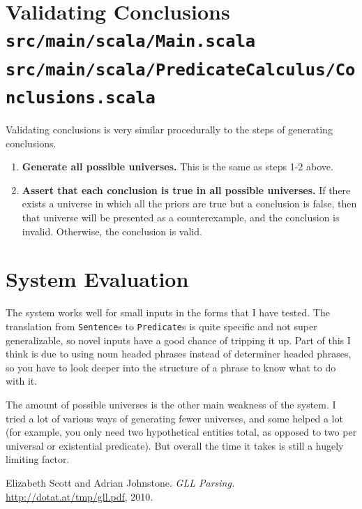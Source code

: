 \documentclass[a4paper, 11pt]{article}
\begin{document}
\section[Validating Conclusions]{Validating Conclusions
	\\ \normalsize \texttt{src/main/scala/Main.scala}
	\\ \normalsize \texttt{src/main/scala/PredicateCalculus/Conclusions.scala}}
Validating conclusions is very similar procedurally to the steps of generating conclusions.
\begin{enumerate}
\item \textbf{Generate all possible universes.} This is the same as steps 1-2 above.
\item \textbf{Assert that each conclusion is true in all possible universes.} 
If there exists a universe in which all the priors are true but a conclusion is false, 
then that universe will be presented as a counterexample, and the conclusion is invalid. 
Otherwise, the conclusion is valid.
\end{enumerate}
\section{System Evaluation}
The system works well for small inputs in the forms that I have tested. 
The translation from \texttt{Sentence}s to \texttt{Predicate}s is quite specific and not super generalizable, so novel inputs have a good chance of tripping it up. 
Part of this I think is due to using noun headed phrases instead of determiner headed phrases, so you have to look deeper into the structure of a phrase to know what to do with it.

The amount of possible universes is the other main weakness of the system.
I tried a lot of various ways of generating fewer universes, and some helped a lot
(for example, you only need two hypothetical entities total, as opposed to two per
universal or existential predicate). But overall the time it takes is still a hugely limiting factor. 
\begin{thebibliography}{9}
 Elizabeth Scott and Adrian Johnstone. \emph{GLL Parsing.} \url{http://dotat.at/tmp/gll.pdf}, 2010.
\end{thebibliography}
\end{document}
